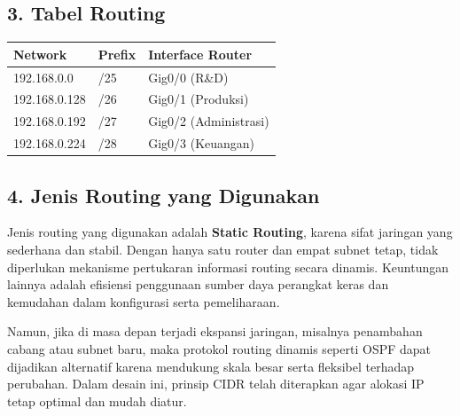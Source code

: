 	\subsection*{3. Tabel Routing}

\begin{tabular}{|l|l|l|}
\hline
\textbf{Network} & \textbf{Prefix} & \textbf{Interface Router} \\
\hline
192.168.0.0 & /25 & Gig0/0 (R\&D) \\
192.168.0.128 & /26 & Gig0/1 (Produksi) \\
192.168.0.192 & /27 & Gig0/2 (Administrasi) \\
192.168.0.224 & /28 & Gig0/3 (Keuangan) \\
\hline
\end{tabular}

        \subsection*{4. Jenis Routing yang Digunakan}

Jenis routing yang digunakan adalah \textbf{Static Routing}, karena sifat jaringan yang sederhana dan stabil. Dengan hanya satu router dan empat subnet tetap, tidak diperlukan mekanisme pertukaran informasi routing secara dinamis. Keuntungan lainnya adalah efisiensi penggunaan sumber daya perangkat keras dan kemudahan dalam konfigurasi serta pemeliharaan.

Namun, jika di masa depan terjadi ekspansi jaringan, misalnya penambahan cabang atau subnet baru, maka protokol routing dinamis seperti OSPF dapat dijadikan alternatif karena mendukung skala besar serta fleksibel terhadap perubahan. Dalam desain ini, prinsip CIDR telah diterapkan agar alokasi IP tetap optimal dan mudah diatur.